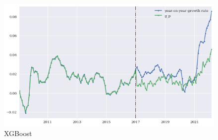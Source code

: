 \documentclass[reqno]{amsart}
\theoremstyle{definition}
\begin{document}
\begin{figure}[t]
\centering
\caption{XGBoost}
\includegraphics[scale=0.8]{XGBoost.png}
\end{figure}
~\\
~\\
~\\
~\\
~\\
~\\
~\\
~\\
~\\
~\\
~\\
~\\
~\\
~\\
~\\
~\\
~\\
~\\
\end{document}
